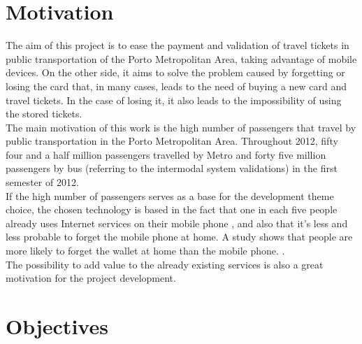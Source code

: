 \documentclass[9pt,a4paper]{extarticle}
\begin{document}
\begin{multicols}{2}

\section{Motivation}\label{sec:motiva}

The aim of this project is to ease the payment and validation of travel tickets in public transportation of the Porto Metropolitan Area, taking advantage of mobile devices. On the other side, it aims to solve the problem caused by forgetting or losing the card that, in many cases, leads to the need of buying a new card and travel tickets. In the case of losing it, it also leads to the impossibility of using the stored tickets.
\\The main motivation of this work is the high number of passengers that travel by public transportation in the Porto Metropolitan Area. Throughout 2012, fifty four and a half million passengers travelled by Metro \cite{INE20130528} and forty five million passengers by bus (referring to the intermodal system validations) in the first semester of 2012. \cite{andante}
\\If the high number of passengers serves as a base for the development theme choice, the chosen technology is based in the fact that one in each five people already uses Internet services on their mobile phone \cite{INE20121106}, and also that it’s less and less probable to forget the mobile phone at home. A study shows that people are more likely to forget the wallet at home than the mobile phone. \cite{NFCForum2011}.
\\The possibility to add value to the already existing services is also a great motivation for the project development.

\section{Objectives}\label{sec:goals}


\end{multicols}
\end{document}
